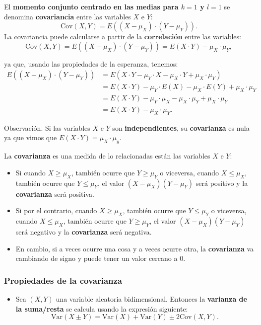 \documentclass[
  letterpaper,
  DIV=11,
  numbers=noendperiod]{scrreprt}
\providecommand{\tightlist}{%
  \setlength{\itemsep}{0pt}\setlength{\parskip}{0pt}}\usepackage{longtable,booktabs,array}
\begin{document}
El \textbf{momento conjunto centrado en las medias para \(k=1\) y
\(l=1\)} se denomina \textbf{covariancia} entre las variables \(X\) e
\(Y\): \[
\mathrm{Cov}(X,Y)=E((X-\mu_X)\cdot (Y-\mu_Y)).
\] La covariancia puede calcularse a partir de la \textbf{correlación}
entre las variables: \[
\mathrm{Cov}(X,Y)=E((X-\mu_X) \cdot (Y-\mu_Y))=E(X\cdot Y)-\mu_X\cdot \mu_Y,
\]

ya que, usando las propiedades de la esperanza, tenemos: \[
\begin{array}{rl}
E((X-\mu_X)\cdot (Y-\mu_Y)) & =E(X\cdot Y-\mu_Y \cdot X-\mu_X \cdot Y+\mu_X\cdot \mu_Y)\\ & =E(X\cdot Y)-\mu_Y\cdot E(X)-\mu_X \cdot E(Y)+\mu_X\cdot \mu_Y \\ &  = E(X\cdot Y)-\mu_Y\cdot \mu_X-\mu_X \cdot \mu_Y+\mu_X\cdot \mu_Y \\ & = E(X\cdot Y)-\mu_X\cdot \mu_Y.
\end{array}
\]

Observación. Si las variables \(X\) e \(Y\) son \textbf{independientes},
su \textbf{covarianza} es nula ya que vimos que
\(E(X\cdot Y)=\mu_X\cdot \mu_y\).

La \textbf{covarianza} es una medida de lo relacionadas están las
variables \(X\) e \(Y\):

\begin{itemize}
\item
  Si cuando \(X\geq \mu_X\), también ocurre que \(Y\geq \mu_Y\) o
  viceversa, cuando \(X\leq \mu_X\), también ocurre que \(Y\leq \mu_Y\),
  el valor \((X-\mu_X)(Y-\mu_Y)\) será positivo y la \textbf{covarianza}
  será positiva.
\item
  Si por el contrario, cuando \(X\geq \mu_X\), también ocurre que
  \(Y\leq \mu_Y\) o viceversa, cuando \(X\leq \mu_X\), también ocurre
  que \(Y\geq \mu_Y\), el valor \((X-\mu_X)(Y-\mu_Y)\) será negativo y
  la \textbf{covarianza} será negativa.
\item
  En cambio, si a veces ocurre una cosa y a veces ocurre otra, la
  \textbf{covarianza} va cambiando de signo y puede tener un valor
  cercano a 0.
\end{itemize}

\hypertarget{propiedades-de-la-covarianza}{%
\subsubsection{Propiedades de la
covarianza}\label{propiedades-de-la-covarianza}}

\begin{itemize}
\tightlist
\item
  Sea \((X,Y)\) una variable aleatoria bidimensional. Entonces la
  \textbf{varianza de la suma/resta} se calcula usando la expresión
  siguiente: \[
  \mathrm{Var}(X\pm Y)=\mathrm{Var}(X)+\mathrm{Var}(Y)\pm 2 \mathrm{Cov}(X,Y).
  \]
\end{itemize}
\end{document}
